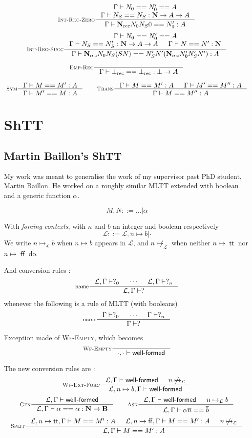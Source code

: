 \documentclass{article}
\DeclareMathOperator{\rec}{rec}
\DeclareMathOperator{\true}{\mathsf{tt}}
\DeclareMathOperator{\false}{\mathsf{ff}}
\newcommand{\ovl}{\overline}
\newcommand{\0}{\mathbf{0}}
\newcommand{\1}{\mathbf{1}}
\newcommand{\nat}{\mathbf{N}}
\newcommand{\bool}{\mathbf{B}}
\newcommand{\tctx}{\Gamma}
\newcommand{\Wf}{\textsf{well-formed}}
\newcommand{\fctx}{\mathcal{L}}
\begin{document}
$$
    \inference[\textsc{Int-Rec-Zero}]{\tctx |- N_0 == N'_0 == A\\ \tctx |- N_S == N_S : \nat -> A  -> A}{\tctx |- \nat_{\rec} N_0N_S0 == N'_0 : A}
$$
$$
    \inference[\textsc{Int-Rec-Succ}]{\tctx |- N_0 == N'_0 == A\\ \tctx |- N_S == N'_S : \nat -> A  -> A & \tctx |- N == N' :\nat}{\tctx |- \nat_{\rec} N_0N_S (S N) == N'_S N' (\nat_{\rec}N'_0 N'_S N') : A}
$$


$$
    \inference[\textsc{Emp-Rec}]{}{\tctx |- \bot_{\rec} == \bot_{\rec} : \bot -> A}
$$

$$
    \inference[\textsc{Sym}]{\tctx |- M == M' : A}{\tctx |- M' == M : A} \qquad
    \inference[\textsc{Trans}]
    {\tctx |- M == M' :A & \tctx |- M' == M'' : A}{\tctx |- M == M'' : A}
$$

\section{ShTT}
\subsection{Martin Baillon's ShTT}\label{MBshtt}
My work was meant to generalise the work of my supervisor past PhD student, Martin Baillon. He worked on a roughly similar MLTT extended with boolean and a generic function $\alpha$.

$$ M, N ::= \dots |\alpha$$

With \emph{forcing contexts}, with $n$ and $b$ an integer and boolean respectively
$$ \fctx ::= \fctx, n \mapsto b | \cdot$$
We write $n\mapsto_\fctx b$ when $n\mapsto b$ appears in $\fctx$, and $n\not\mapsto_\fctx$ when neither $n\mapsto \true$ nor $n\mapsto \false$ do.

And conversion rules :
$$
    \inference[name]{\fctx,\tctx |- ?_0 & \cdots & \fctx,\tctx |- ?_n}{\fctx,\tctx |- ?}
$$
whenever the following is a rule of MLTT (with booleans)
$$
    \inference[name]{\tctx |- ?_0 & \cdots & \tctx |- ?_n}{\tctx |- ?}
$$

Exception made of \textsc{Wf-Empty}, which becomes
$$
    \inference[\textsc{Wf-Empty}]{}{\cdot,\cdot |- \Wf}
$$

The new conversion rules are :
$$
    \inference[\textsc{Wf-Ext-Forc}]{\fctx,\tctx |- \Wf & n\not\mapsto_\fctx}{\fctx, n\mapsto b, \tctx |- \Wf}
$$
$$
    \inference[\textsc{Gen}]{\fctx,\tctx|- \Wf}{\fctx,\tctx |- \alpha == \alpha : \nat -> \bool}
    \qquad
    \inference[\textsc{Ask}]{\fctx,\tctx|- \Wf &n\mapsto_\fctx b}{\fctx, \tctx |- \alpha \ovl n == \ovl b}
$$
$$
    \inference[\textsc{Split}]{\fctx,n\mapsto \true,\tctx |-M == M' :A & \fctx, n\mapsto\false, \tctx |- M == M' : A & n\not\mapsto_\fctx}{\fctx,\tctx |- M == M' : A}
$$
\end{document}

